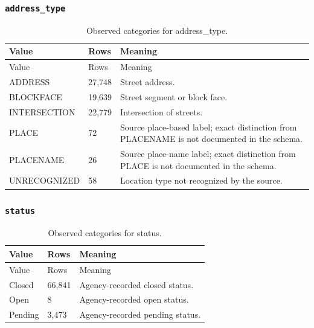 \subsubsection*{\texttt{address\_\allowbreak{}type}}
\begin{longtable}{@{}p{.32\linewidth}p{.09\linewidth}p{.53\linewidth}@{}}
\caption{Observed categories for address\_type.}\\
\toprule Value & Rows & Meaning\\\midrule\endfirsthead
\toprule Value & Rows & Meaning\\\midrule\endhead
\bottomrule\endfoot
ADDRESS & 27,748 & Street address.\\
BLOCKFACE & 19,639 & Street segment or block face.\\
INTERSECTION & 22,779 & Intersection of streets.\\
PLACE & 72 & Source place-based label; exact distinction from PLACENAME is not documented in the schema.\\
PLACENAME & 26 & Source place-name label; exact distinction from PLACE is not documented in the schema.\\
UNRECOGNIZED & 58 & Location type not recognized by the source.\\
\end{longtable}
\subsubsection*{\texttt{status}}
\begin{longtable}{@{}p{.32\linewidth}p{.09\linewidth}p{.53\linewidth}@{}}
\caption{Observed categories for status.}\\
\toprule Value & Rows & Meaning\\\midrule\endfirsthead
\toprule Value & Rows & Meaning\\\midrule\endhead
\bottomrule\endfoot
Closed & 66,841 & Agency-recorded closed status.\\
Open & 8 & Agency-recorded open status.\\
Pending & 3,473 & Agency-recorded pending status.\\
\end{longtable}
